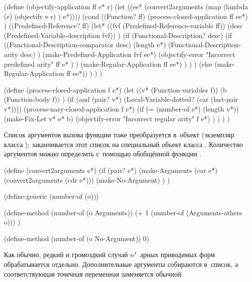\begin{code:lisp}
(define (objectify-application ff e* r)
  (let ((ee* (convert2arguments (map (lambda (e)
                                       (objectify e r) ) e*))))
    (cond ((Function? ff)
           (process-closed-application ff ee*) )
          ((Predefined-Reference? ff)
           (let* ((fvf  (Predefined-Reference-variable ff))
                  (desc (Predefined-Variable-description fvf)) )
             (if (Functional-Description? desc)
                 (if ((Functional-Description-comparator desc)
                      (length e*) (Functional-Description-arity desc) )
                     (make-Predefined-Application fvf ee*)
                     (objectify-error
                      "Incorrect predefined arity" ff e* ) )
                 (make-Regular-Application ff ee*) ) ) )
          (else (make-Regular-Application ff ee*)) ) ) )

(define (process-closed-application f e*)
  (let ((v* (Function-variables f))
        (b  (Function-body f)) )
    (if (and (pair? v*) (Local-Variable-dotted? (car (last-pair v*))))
        (process-nary-closed-application f e*)
        (if (= (number-of e*) (length v*))
            (make-Fix-Let v* e* b)
            (objectify-error "Incorrect regular arity" f e*) ) ) ) )
\end{code:lisp}

Список аргументов вызова функции тоже преобразуется в~объект (экземпляр класса
); заканчивается этот список на специальный объект класса
. Количество аргументов можно определить с~помощью обобщённой
функции .

\begin{code:lisp}
(define (convert2arguments e*)
  (if (pair? e*)
      (make-Arguments (car e*) (convert2arguments (cdr e*)))
      (make-No-Argument) ) )

(define-generic (number-of (o)))

(define-method (number-of (o Arguments))
  (+ 1 (number-of (Arguments-others o))) )

(define-method (number-of (o No-Argument)) 0)
\end{code:lisp}

Как обычно, редкий и громоздкий случай $n$"~арных приводимых форм обрабатывается
отдельно. Дополнительные аргументы собираются в~список, а соответствующая
точечная переменная заменяется обычной.

